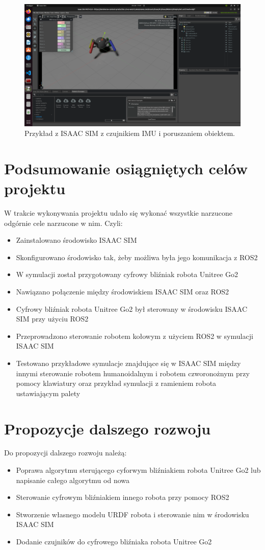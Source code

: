 \documentclass[12pt]{article}
\begin{document}
\begin{figure}
    \centering
    \includegraphics[width=0.7\linewidth]{Zdjęcia/poruszanieIMU.png}
    \caption{Przykład z ISAAC SIM z czujnikiem IMU i poruszaniem obiektem.}
    \label{ruchIMU}
\end{figure}

\clearpage

\section{Podsumowanie osiągniętych celów projektu}

W trakcie wykonywania projektu udało się wykonać wszystkie narzucone odgórnie cele narzucone w nim. Czyli:
\begin{itemize}
    \item Zainstalowano środowisko ISAAC SIM
    \item Skonfigurowano środowisko tak, żeby możliwa była jego komunikacja z ROS2
    \item W symulacji został przygotowany cyfrowy bliźniak robota Unitree Go2
    \item Nawiązano połączenie między środowiskiem ISAAC SIM oraz ROS2
    \item Cyfrowy bliźniak robota Unitree Go2 był sterowany w środowisku ISAAC SIM przy użyciu ROS2
    \item Przeprowadzono sterowanie robotem kołowym z użyciem ROS2 w symulacji ISAAC SIM
    \item Testowano przykładowe symulacje znajdujące się w ISAAC SIM między innymi sterowanie robotem humanoidalnym i robotem czworonożnym przy pomocy klawiatury oraz przykład symulacji z ramieniem robota ustawiającym palety 
    
\end{itemize}

\section{Propozycje dalszego rozwoju}

Do propozycji dalszego rozwoju należą:
\begin{itemize}
    \item Poprawa algorytmu sterującego cyforwym bliźniakiem robota Unitree Go2 lub napisanie całego algorytmu od nowa
    \item Sterowanie cyfrowym bliźniakiem innego robota przy pomocy ROS2
    \item Stworzenie własnego modelu URDF robota i sterowanie nim w środowisku ISAAC SIM
    \item Dodanie czujników do cyfrowego bliźniaka robota Unitree Go2
\end{itemize}
\end{document}
